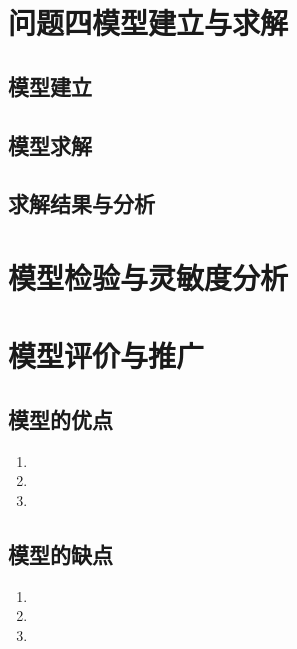 \documentclass{JXUSTmodeling}
\begin{document}
\section{问题四模型建立与求解}
\subsection{模型建立}
\subsection{模型求解}
\subsection{求解结果与分析}

\section{模型检验与灵敏度分析}

\section{模型评价与推广}
\subsection{模型的优点}
\begin{enumerate}[label=\arabic*., wide=0pt, labelsep=0.5em]
	\item %
	\item %
	\item %
\end{enumerate}

\subsection{模型的缺点}
\begin{enumerate}[label=\arabic*., wide=0pt, labelsep=0.5em]
	\item %
	\item %
	\item %
\end{enumerate}
\end{document}
